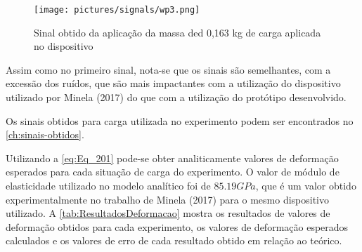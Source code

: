 \begin{figure}[H]
	\caption{\label{fig:4109_m} Sinal obtido da aplicação da massa ded 0,163 kg de carga aplicada no dispositivo}
	\begin{center}
		\texttt{[image: pictures/signals/wp3.png]}
	\end{center}
\end{figure}

Assim como no primeiro sinal, nota-se que os sinais são semelhantes, com a excessão dos ruídos, que são mais impactantes com 
a utilização do dispositivo utilizado por Minela (2017) do que com a utilização do protótipo desenvolvido.

Os sinais obtidos para carga utilizada no experimento podem ser encontrados no \autoref{ch:sinais-obtidos}.

Utilizando a \autoref{eq:Eq_201} pode-se obter analiticamente valores de deformação esperados para cada situação de carga do experimento.
O valor de módulo de elasticidade utilizado no modelo analítico foi de $ 85.19 GPa $, que é um valor obtido experimentalmente no trabalho de Minela (2017)
para o mesmo dispositivo utilizado.
A \autoref{tab:ResultadosDeformacao} mostra os resultados de valores de deformação obtidos para cada experimento, os valores de deformação esperados
calculados e os valores de erro de cada resultado obtido em relação ao teórico.

\begin{table}[H]
    \caption{Cargas aplicadas para os experimentos}
    \label{tab:ResultadosDeformacao}
    \centering
\end{table}





%

